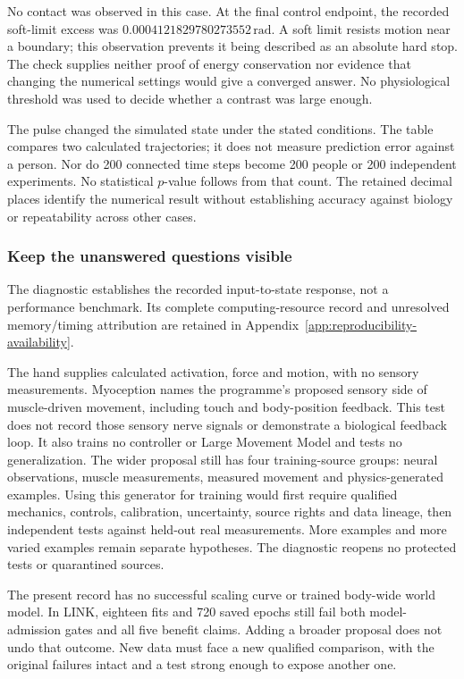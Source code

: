No contact was observed in this case. At the final control endpoint, the recorded soft-limit excess was $0.0004121829780273552\,\mathrm{rad}$. A soft limit resists motion near a boundary; this observation prevents it being described as an absolute hard stop. The check supplies neither proof of energy conservation nor evidence that changing the numerical settings would give a converged answer. No physiological threshold was used to decide whether a contrast was large enough.

The pulse changed the simulated state under the stated conditions. The table compares two calculated trajectories; it does not measure prediction error against a person. Nor do 200 connected time steps become 200 people or 200 independent experiments. No statistical $p$-value follows from that count. The retained decimal places identify the numerical result without establishing accuracy against biology or repeatability across other cases.

\subsubsection{Keep the unanswered questions visible}

The diagnostic establishes the recorded input-to-state response, not a performance benchmark. Its complete computing-resource record and unresolved memory/timing attribution are retained in Appendix~\ref{app:reproducibility-availability}.

The hand supplies calculated activation, force and motion, with no sensory measurements. Myoception names the programme's proposed sensory side of muscle-driven movement, including touch and body-position feedback. This test does not record those sensory nerve signals or demonstrate a biological feedback loop. It also trains no controller or Large Movement Model and tests no generalization. The wider proposal still has four training-source groups: neural observations, muscle measurements, measured movement and physics-generated examples. Using this generator for training would first require qualified mechanics, controls, calibration, uncertainty, source rights and data lineage, then independent tests against held-out real measurements. More examples and more varied examples remain separate hypotheses. The diagnostic reopens no protected tests or quarantined sources.

The present record has no successful scaling curve or trained body-wide world model. In LINK, eighteen fits and 720 saved epochs still fail both model-admission gates and all five benefit claims. Adding a broader proposal does not undo that outcome. New data must face a new qualified comparison, with the original failures intact and a test strong enough to expose another one.
